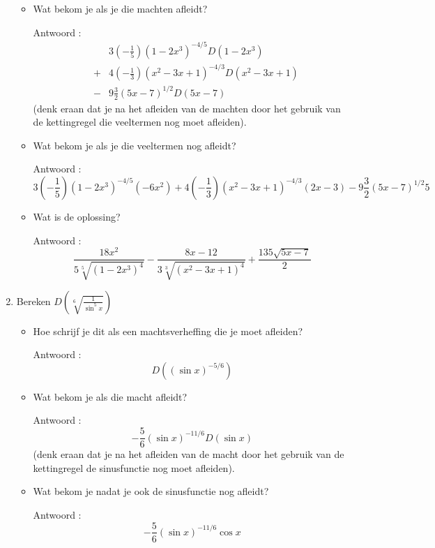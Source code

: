 \begin{enumerate}
\begin{itemize}
		\item Wat bekom je als je die machten afleidt? 
		
		Antwoord :
		\begin{eqnarray*}
		&& 3\left(- \frac{1}{5} \right)\left( 1-2x^3  \right)^{-4/5}D\left( 1-2x^3  \right) \\
		&+&4\left( -\frac{1}{3}  \right)\left( x^2-3x+1  \right)^{-4/3}D\left( x^2-3x+1  \right) \\
		&-&9\frac{3}{2}\left( 5x-7  \right)^{1/2}D(5x-7)
		\end{eqnarray*}
		 (denk eraan dat je na het afleiden van de machten door het gebruik van de kettingregel die veeltermen nog moet afleiden).
		
		\item Wat bekom je als je die veeltermen nog afleidt?
		
		Antwoord : \[3\left(- \frac{1}{5} \right)\left( 1-2x^3  \right)^{-4/5}\left( -6x^2  \right)+4\left( -\frac{1}{3}  \right)\left( x^2-3x+1  \right)^{-4/3}\left(2 x-3  \right)-9\frac{3}{2}\left( 5x-7  \right)^{1/2}5\]
		
		\item Wat is de oplossing?
		
		Antwoord : \[\frac{18x^2}{5\sqrt[5]{\left( 1-2x^3 \right) ^4}}-\frac{8x-12}{3\sqrt[3]{\left( x^2-3x+1 \right)^4}}+\frac{135 \sqrt{5x-7}}{2}\]
		
	\end{itemize}
	
	\item Bereken $D \left( \sqrt[6]{\frac{1}{\sin ^5x}}  \right)$
	
	\begin{itemize}
		
		\item Hoe schrijf je dit als een machtsverheffing die je moet afleiden?
		
		Antwoord : \[D \left( (\sin x)^{-5/6}  \right)\]
		
		\item Wat bekom je als die macht afleidt? 
		
		Antwoord : \[-\frac{5}{6} (\sin x)^{-11/6} D(\sin x)\] (denk eraan dat je na het afleiden van de macht door het gebruik van de kettingregel de sinusfunctie nog moet afleiden).
		
		\item Wat bekom je nadat je ook de sinusfunctie nog afleidt?
		
		Antwoord : \[-\frac{5}{6} (\sin x)^{-11/6} \cos x\]
		

\end{itemize}
\end{enumerate}

